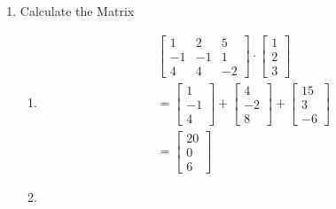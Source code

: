 \documentclass{article}
\begin{document}
\begin{enumerate}
        \item Calculate the Matrix 
            \begin{enumerate}
                \item 
                    \begin{gather}
                        \begin{bmatrix}
                            1 & 2 & 5\\ 
                            -1 & -1 & 1\\
                            4 & 4 & -2
                        \end{bmatrix} \cdot
                        \begin{bmatrix}
                            1\\ 
                            2\\
                            3
                        \end{bmatrix}\\
                        = \begin{bmatrix}
                            1\\ 
                            -1\\
                            4
                        \end{bmatrix} +
                        \begin{bmatrix}
                            4\\ 
                            -2\\
                            8
                        \end{bmatrix} +
                        \begin{bmatrix}
                            15\\ 
                            3\\
                            -6
                        \end{bmatrix}\\
                        = \begin{bmatrix}
                            20\\ 
                            0\\
                            6
                        \end{bmatrix}
                    \end{gather}
                \item 
                    \begin{gather}

\end{gather}
\end{enumerate}
\end{enumerate}
\end{document}
